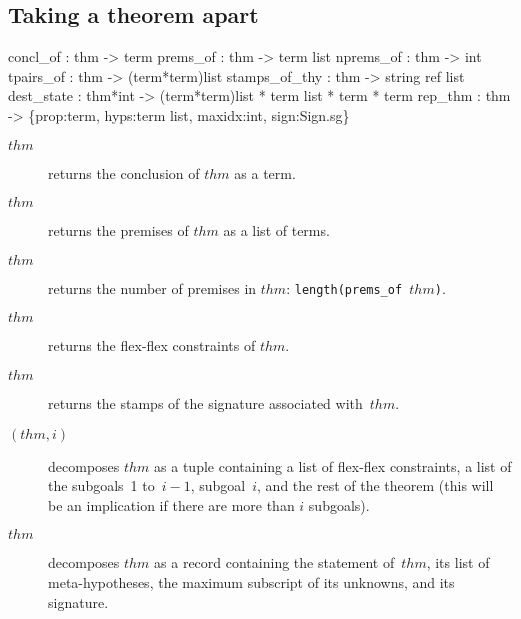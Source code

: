 \subsection{Taking a theorem apart}
\begin{ttbox} 
concl_of      : thm -> term
prems_of      : thm -> term list
nprems_of     : thm -> int
tpairs_of     : thm -> (term*term)list
stamps_of_thy : thm -> string ref list
dest_state    : thm*int -> (term*term)list * term list * term * term
rep_thm       : thm -> \{prop:term, hyps:term list, 
                        maxidx:int, sign:Sign.sg\}
\end{ttbox}
\begin{description}
\item[ $thm$] 
returns the conclusion of $thm$ as a term.

\item[ $thm$] 
returns the premises of $thm$ as a list of terms.

\item[ $thm$] 
returns the number of premises in $thm$: {\tt length(prems_of~$thm$)}.

\item[ $thm$] 
returns the flex-flex constraints of $thm$.

\item[ $thm$] 
returns the stamps of the signature associated with~$thm$.

\item[ $(thm,i)$] 
decomposes $thm$ as a tuple containing a list of flex-flex constraints, a
list of the subgoals~1 to~$i-1$, subgoal~$i$, and the rest of the theorem
(this will be an implication if there are more than $i$ subgoals).

\item[ $thm$] 
decomposes $thm$ as a record containing the statement of~$thm$, its list of
meta-hypotheses, the maximum subscript of its unknowns, and its signature.
\end{description}



